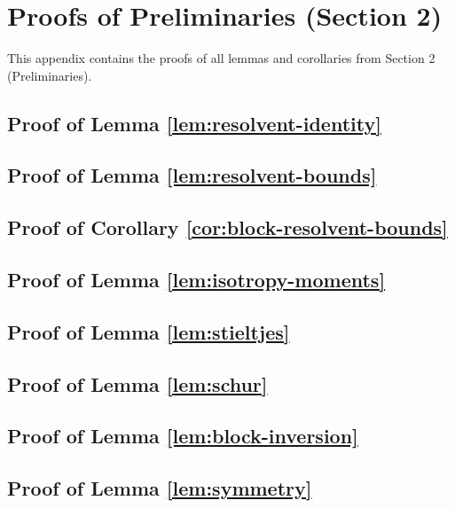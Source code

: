 
\section{Proofs of Preliminaries (Section 2)}

This appendix contains the proofs of all lemmas and corollaries from Section 2 (Preliminaries).

\subsection{Proof of Lemma \ref{lem:resolvent-identity}}


\subsection{Proof of Lemma \ref{lem:resolvent-bounds}}


\subsection{Proof of Corollary \ref{cor:block-resolvent-bounds}}


\subsection{Proof of Lemma \ref{lem:isotropy-moments}}


\subsection{Proof of Lemma \ref{lem:stieltjes}}


\subsection{Proof of Lemma \ref{lem:schur}}


\subsection{Proof of Lemma \ref{lem:block-inversion}}


\subsection{Proof of Lemma \ref{lem:symmetry}}

